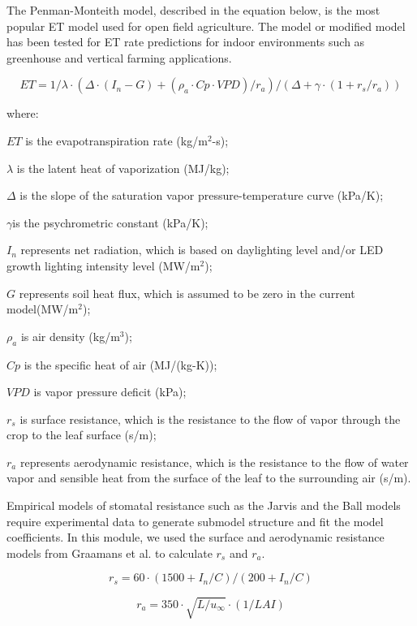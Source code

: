 The Penman-Monteith model, described in the equation below,  is the most popular ET model used for open field agriculture. The model or modified model has been tested for ET rate predictions for indoor environments such as greenhouse and vertical farming applications. 

\begin{equation}
ET=1/\lambda \cdot (\Delta \cdot(I_n-G)+(\rho_a \cdot Cp \cdot VPD)/r_a )/(\Delta+\gamma \cdot (1+r_s/r_a ) )
\end{equation}

where:

\(ET\) is the evapotranspiration rate (kg/m\(^2\)-s);
 
\(\lambda\) is the latent heat of vaporization (MJ/kg); 

\(\Delta\) is the slope of the saturation vapor pressure-temperature curve (kPa/K); 

\(\gamma\)is the psychrometric constant (kPa/K);

\(I_n\) represents net radiation, which is based on daylighting level and/or LED growth lighting intensity level (MW/m\(^2\));

\(G\) represents soil heat flux, which is assumed to be zero in the current model(MW/m\(^2\));

\(\rho_a\) is air density (kg/m\(^3\));

\(Cp\) is the specific heat of air (MJ/(kg-K));

\(VPD\) is vapor pressure deficit (kPa);

\(r_s\) is surface resistance, which is the resistance to the flow of vapor through the crop to the leaf surface (s/m); 

\(r_a\) represents aerodynamic resistance, which is the resistance to the flow of water vapor and sensible heat from the surface of the leaf to the surrounding air (s/m).

Empirical models of stomatal resistance such as the Jarvis and the Ball models require experimental data to generate submodel structure and fit the model coefficients.  In this module, we used the surface and aerodynamic resistance models from Graamans et al. to calculate $r_s$ and $r_a$. 

\begin{equation}
r_s=60 \cdot (1500+I_n/C)/(200+I_n/C) 
\end{equation}

\begin{equation}
r_a=350 \cdot \sqrt{L/u_\infty} \cdot (1/LAI)
\end{equation}

